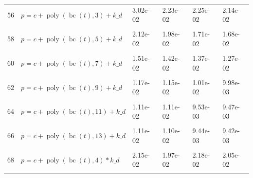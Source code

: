 \documentclass[12pt,a4paper]{article}
\DeclareMathOperator{\bc}{bc}
\DeclareMathOperator{\poly}{poly}
\begin{document}
\begin{longtable}[t]{ll>{\raggedleft\arraybackslash}p{2cm}>{\raggedleft\arraybackslash}p{2cm}>{\raggedleft\arraybackslash}p{2cm}>{\raggedleft\arraybackslash}p{2cm}}
56 & $p = c + \poly\left( \bc(t), 3 \right) + k\_d$ & 3.02e-02 & 2.23e-02 & 2.25e-02 & 2.14e-02\\
\cellcolor{gray!6}{57} & \cellcolor{gray!6}{$p = c + \poly\left( \bc(t), 4 \right) + k\_d$} & \cellcolor{gray!6}{2.58e-02} & \cellcolor{gray!6}{2.36e-02} & \cellcolor{gray!6}{2.51e-02} & \cellcolor{gray!6}{2.38e-02}\\
58 & $p = c + \poly\left( \bc(t), 5 \right) + k\_d$ & 2.12e-02 & 1.98e-02 & 1.71e-02 & 1.68e-02\\
\cellcolor{gray!6}{59} & \cellcolor{gray!6}{$p = c + \poly\left( \bc(t), 6 \right) + k\_d$} & \cellcolor{gray!6}{1.59e-02} & \cellcolor{gray!6}{1.47e-02} & \cellcolor{gray!6}{1.28e-02} & \cellcolor{gray!6}{1.25e-02}\\
60 & $p = c + \poly\left( \bc(t), 7 \right) + k\_d$ & 1.51e-02 & 1.42e-02 & 1.37e-02 & 1.27e-02\\
\cellcolor{gray!6}{61} & \cellcolor{gray!6}{$p = c + \poly\left( \bc(t), 8 \right) + k\_d$} & \cellcolor{gray!6}{1.20e-02} & \cellcolor{gray!6}{1.17e-02} & \cellcolor{gray!6}{9.97e-03} & \cellcolor{gray!6}{9.94e-03}\\
62 & $p = c + \poly\left( \bc(t), 9 \right) + k\_d$ & 1.17e-02 & 1.15e-02 & 1.01e-02 & 9.98e-03\\
\cellcolor{gray!6}{63} & \cellcolor{gray!6}{$p = c + \poly\left( \bc(t), 10 \right) + k\_d$} & \cellcolor{gray!6}{1.15e-02} & \cellcolor{gray!6}{1.13e-02} & \cellcolor{gray!6}{9.72e-03} & \cellcolor{gray!6}{9.68e-03}\\
64 & $p = c + \poly\left( \bc(t), 11 \right) + k\_d$ & 1.11e-02 & 1.11e-02 & 9.53e-03 & 9.47e-03\\
\cellcolor{gray!6}{65} & \cellcolor{gray!6}{$p = c + \poly\left( \bc(t), 12 \right) + k\_d$} & \cellcolor{gray!6}{1.11e-02} & \cellcolor{gray!6}{1.10e-02} & \cellcolor{gray!6}{9.48e-03} & \cellcolor{gray!6}{9.45e-03}\\
66 & $p = c + \poly\left( \bc(t), 13 \right) + k\_d$ & 1.11e-02 & 1.10e-02 & 9.44e-03 & 9.42e-03\\
\cellcolor{gray!6}{67} & \cellcolor{gray!6}{$p = c + \poly\left( \bc(t), 3 \right) * k\_d$} & \cellcolor{gray!6}{2.75e-02} & \cellcolor{gray!6}{1.87e-02} & \cellcolor{gray!6}{1.94e-02} & \cellcolor{gray!6}{1.82e-02}\\
68 & $p = c + \poly\left( \bc(t), 4 \right) * k\_d$ & 2.15e-02 & 1.97e-02 & 2.18e-02 & 2.05e-02\\
\cellcolor{gray!6}{69} & \cellcolor{gray!6}{$p = c + \poly\left( \bc(t), 5 \right) * k\_d$} & \cellcolor{gray!6}{1.64e-02} & \cellcolor{gray!6}{1.58e-02} & \cellcolor{gray!6}{1.32e-02} & \cellcolor{gray!6}{1.29e-02}\\

\end{longtable}
\end{document}
